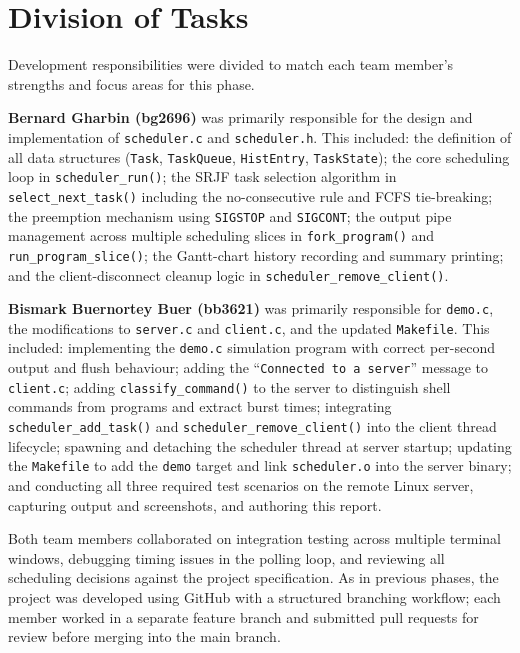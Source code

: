 \documentclass[12pt]{article}
\begin{document}
\section{Division of Tasks}

Development responsibilities were divided to match each team member's strengths and focus
areas for this phase.

\textbf{Bernard Gharbin (bg2696)} was primarily responsible for the design and
implementation of \texttt{scheduler.c} and \texttt{scheduler.h}. This included: the
definition of all data structures (\texttt{Task}, \texttt{TaskQueue}, \texttt{HistEntry},
\texttt{TaskState}); the core scheduling loop in \texttt{scheduler\_run()}; the SRJF
task selection algorithm in \texttt{select\_next\_task()} including the no-consecutive
rule and FCFS tie-breaking; the preemption mechanism using \texttt{SIGSTOP} and
\texttt{SIGCONT}; the output pipe management across multiple scheduling slices in
\texttt{fork\_program()} and \texttt{run\_program\_slice()}; the Gantt-chart history
recording and summary printing; and the client-disconnect cleanup logic in
\texttt{scheduler\_remove\_client()}.

\textbf{Bismark Buernortey Buer (bb3621)} was primarily responsible for
\texttt{demo.c}, the modifications to \texttt{server.c} and \texttt{client.c}, and the
updated \texttt{Makefile}. This included: implementing the \texttt{demo.c} simulation
program with correct per-second output and flush behaviour; adding the
``\texttt{Connected to a server}'' message to \texttt{client.c}; adding
\texttt{classify\_command()} to the server to distinguish shell commands from programs
and extract burst times; integrating \texttt{scheduler\_add\_task()} and
\texttt{scheduler\_remove\_client()} into the client thread lifecycle; spawning and
detaching the scheduler thread at server startup; updating the \texttt{Makefile} to add
the \texttt{demo} target and link \texttt{scheduler.o} into the server binary; and
conducting all three required test scenarios on the remote Linux server, capturing output
and screenshots, and authoring this report.

Both team members collaborated on integration testing across multiple terminal windows,
debugging timing issues in the polling loop, and reviewing all scheduling decisions
against the project specification. As in previous phases, the project was developed using
GitHub with a structured branching workflow; each member worked in a separate feature
branch and submitted pull requests for review before merging into the main branch.
\end{document}

